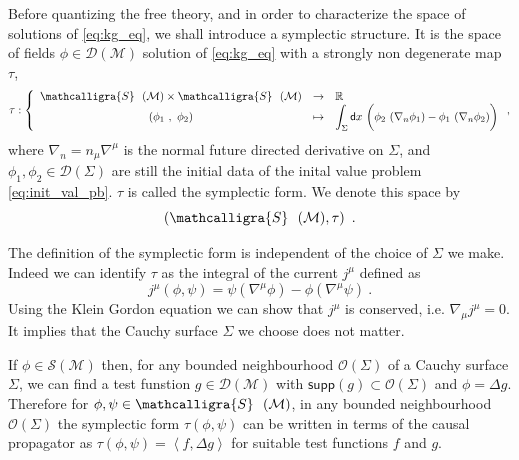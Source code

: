 \documentclass[12pt]{book}
\newcommand{\supp}{\mathsf{supp}}
\newcommand{\reg}{\mathsf{reg}}
\newcommand{\sm}[1]{\left\langle#1\right\rangle}
\let\int\int
\def\bigint{\displaystyle\int}
\newcommand{\Dcal}{\mathcal{D}}
\newcommand{\Fcal}{\mathcal{F}}
\newcommand{\Mcal}{\mathcal{M}}
\newcommand{\Ocal}{\mathcal{O}}
\newcommand{\Scal}{\mathcal{S}}
\newcommand{\Rbb}{\mathbb{R}}
\newcommand{\Fsf}{\mathsf{F}}
\newcommand{\Gsf}{\mathsf{G}}
\newcommand{\dsf}{\mathsf{d}}
\theoremstyle{break}
\begin{document}
Before quantizing the free theory, and in order to characterize the space of solutions of  \eqref{eq:kg_eq}, we shall introduce a symplectic structure. It is the space of fields $\phi \in \Dcal(\Mcal)$ solution of \eqref{eq:kg_eq} with a strongly non degenerate map $\tau$,
%
\begin{equation*}
\tau : \left\{
\begin{array}{ccl}
\mathcalligra{S} \ \ (\Mcal) \times \mathcalligra{S} \ \ (\Mcal) & \to & \Rbb \\
(\phi_1 \ , \ \phi_2) & \mapsto & \bigint_\Sigma  \dsf x \ \bigg( \phi_2 \ (\nabla_n \phi_1) - \phi_1 \ (\nabla_n \phi_2) \bigg)
\end{array}
\right. ,
\end{equation*}
%
where $\nabla_n = n_\mu \nabla^\mu$ is the normal future directed derivative on $\Sigma$, and $\phi_1, \phi_2 \in \Dcal(\Sigma)$  are still the initial data of the inital value problem \eqref{eq:init_val_pb}. $\tau$ is called the symplectic form. We denote this space by 
%
\begin{equation*}
\left(\mathcalligra{S} \ \ (\Mcal),\tau\right) \ . 
\end{equation*}


The definition of the symplectic form is independent of the choice of $\Sigma$ we make. Indeed we can identify $\tau$ as the integral of the current $j^\mu$ defined as
%
\begin{equation*}
j^\mu (\phi,\psi) = \psi (\nabla^\mu \phi) - \phi (\nabla^\mu \psi) \ . 
\label{eq:current}
\end{equation*}
%
Using the Klein Gordon equation we can show that $j^\mu$ is conserved, i.e. $\nabla_\mu j^\mu = 0$. It implies that the Cauchy surface $\Sigma$ we choose does not matter. 




If $\phi \in \Scal(\Mcal)$ then, for any bounded neighbourhood $\Ocal(\Sigma)$ of a Cauchy surface $\Sigma$, we can find a test funstion $g\in \Dcal(\Mcal)$ with $\supp\left(g\right) \subset \Ocal(\Sigma)$ and $\phi = \Delta g$. Therefore for $\phi , \psi \in \mathcalligra{S} \ \ (\Mcal)$, in any bounded neighbourhood $\Ocal(\Sigma)$ the symplectic form $\tau(\phi, \psi)$ can be written in terms of the causal propagator as $\tau(\phi,\psi) = \sm{f , \Delta g}$ for suitable test functions $f$ and $g$. 




%
%
\end{document}
